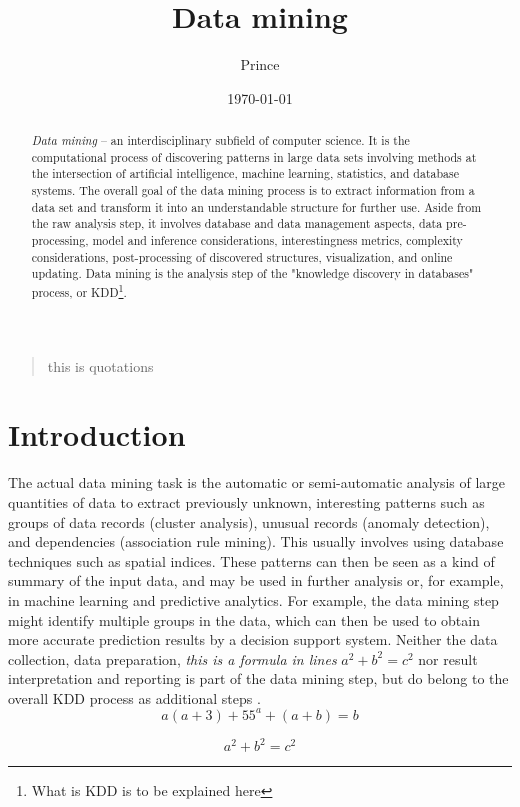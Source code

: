 \documentclass[UTF8]{article}
\title{Data mining}
\author{Prince}
\date{\today}
\begin{document}
        


\maketitle


\begin{abstract}
\emph{Data mining} --  an interdisciplinary subfield of computer science. It is the computational process of discovering patterns in large data sets involving methods at the intersection of artificial intelligence, machine learning, statistics, and database systems. The overall goal of the data mining process is to extract information from a data set and transform it into an understandable structure for further use. Aside from the raw analysis step, it involves database and data management aspects, data pre-processing, model and inference considerations, interestingness metrics, complexity considerations, post-processing of discovered structures, visualization, and online updating. Data mining is the analysis step of the "knowledge discovery in databases" process, or KDD\footnote{What is KDD is to be explained here}.
\end{abstract}

\begin{quote}
this is quotations
\end{quote}
\section{Introduction} 

The actual data mining task is the automatic or semi-automatic analysis of large quantities of data to extract previously unknown, interesting patterns such as groups of data records (cluster analysis), unusual records (anomaly detection), and dependencies (association rule mining). This usually involves using database techniques such as spatial indices. These patterns can then be seen as a kind of summary of the input data, and may be used in further analysis or, for example, in machine learning and predictive analytics. For example, the data mining step might identify multiple groups in the data, which can then be used to obtain more accurate prediction results by a decision support system. Neither the data collection, data preparation, \emph{this is a formula in lines} $a^2+b^2=c^2$ nor result interpretation and reporting is part of the data mining step, but do belong to the overall KDD process as additional steps .
\[
    a(a+3)+55^a+(a+b)=b
\]

\[
    a^2 + b^2 = c^2         
\]

\end{document}
